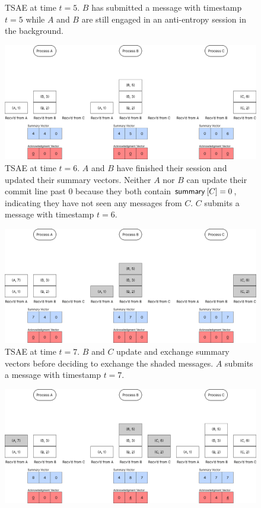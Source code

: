 \documentclass[]             %
{NASA}                       %
\theoremstyle{definition}
\begin{document}
\begin{landscape}
\begin{figure}[h]
    \caption{TSAE at time $t=5$. $B$ has submitted a message with timestamp
      $t = 5$ while $A$ and $B$ are still engaged in an anti-entropy
      session in the background.}
    \label{fig:tsae3}
  \end{figure}
  \begin{figure}[h]
    \centering
    \includegraphics[width=1.4\textwidth]{images/tsae/TSAE6.png}
    \caption{TSAE at time $t=6$. $A$ and $B$ have finished their session and updated their summary vectors. Neither $A$ nor $B$ can update their commit line past $0$ because they both contain $\mathsf{summary}^{}\left[C\right] = 0$, indicating they have not seen any messages from $C$. $C$ submits a message with timestamp $t = 6$.}
    \label{fig:tsae4}
  \end{figure}
  \begin{figure}[h]
    \centering
    \includegraphics[width=1.4\textwidth]{images/tsae/TSAE7.png}
    \caption{TSAE at time $t=7$. $B$ and $C$ update and exchange summary vectors before deciding to exchange the shaded messages. $A$ submits a message with timestamp $t = 7$.}
    \label{fig:tsae4}
  \end{figure}
  \begin{figure}[h]
    \centering
    \includegraphics[width=1.4\textwidth]{images/tsae/TSAE8.png}

\end{figure}
\end{landscape}
\end{document}

